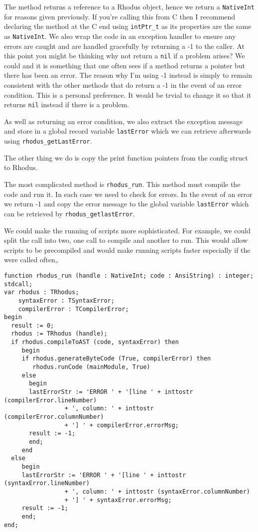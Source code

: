 The method returns a reference to a Rhodus object, hence we return a {\tt NativeInt} for reasons given previously. If you're calling this from C then I recommend declaring the method at the C end using {\tt intPtr_t} as its properties are the same as {\tt NativeInt}. We also wrap the code in an exception handler to ensure any errors are caught and are handled gracefully by returning a -1 to the caller. At this point you might be thinking why not return a {\tt nil} if a problem arises? We could and it is something that one often sees if a method returns a pointer but there has been an error. The reason why I'm using -1 instead is simply to remain consistent with the other methods that do return a -1 in the event of an error condition. This is a personal preference. It would be trvial to change it so that it returns {\tt nil} instead if there is a problem.

As well as returning an error condition, we also extract the exception message and store in a global record variable {\tt lastError} which we can retrieve afterwards using {\tt rhodus_get\-LastError}.

The other thing we do is copy the print function pointers from the config struct to Rhodus.

The most complicated method is {\tt rhodus_run}. This method must compile the code and run it. In each case we need to check for errors. In the event of an error we return -1 and copy the error message to the global variable {\tt lastError} which can be retrieved by {\tt rhodus_getlastError}.

We could make the running of scripts more sophisticated. For example, we could split the call into two, one call to compile and another to run. This would allow scripts to be precompiled and would make running scripts faster especially if the were called often,.

\begin{lstlisting}
function rhodus_run (handle : NativeInt; code : AnsiString) : integer; stdcall;
var rhodus : TRhodus;
    syntaxError : TSyntaxError;
    compilerError : TCompilerError;
begin
  result := 0;
  rhodus := TRhodus (handle);
  if rhodus.compileToAST (code, syntaxError) then
     begin
     if rhodus.generateByteCode (True, compilerError) then
        rhodus.runCode (mainModule, True)
     else
       begin
       lastErrorStr := 'ERROR ' + '[line ' + inttostr (compilerError.lineNumber)
                 + ', column: ' + inttostr (compilerError.columnNumber)
                 + '] ' + compilerError.errorMsg;
       result := -1;
       end;
     end
  else
     begin
     lastErrorStr := 'ERROR ' + '[line ' + inttostr (syntaxError.lineNumber)
                 + ', column: ' + inttostr (syntaxError.columnNumber)
                 + '] ' + syntaxError.errorMsg;
     result := -1;
     end;
end;
\end{lstlisting}

